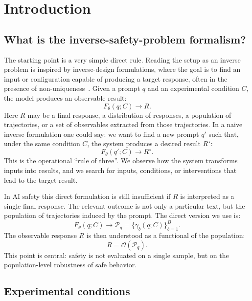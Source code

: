 \documentclass[10pt,twocolumn]{article}
\newcommand{\traj}{\gamma}
\newcommand{\rollouts}{\mathcal{P}}
\newcommand{\obs}{\mathcal{O}}
\begin{document}
\newpage

\section{Introduction}

\subsection{What is the inverse-safety-problem formalism?}

The starting point is a very simple direct rule. Reading the setup as an inverse problem is inspired by inverse-design formulations, where the goal is to find an input or configuration capable of producing a target response, often in the presence of non-uniqueness~\cite{liu2018training,molesky2018inverse}. Given a prompt \(q\) and an experimental condition \(C\), the model produces an observable result:
\[
F_{\theta}(q;C)\longrightarrow R.
\]
Here \(R\) may be a final response, a distribution of responses, a population of trajectories, or a set of observables extracted from those trajectories. In a naive inverse formulation one could say: we want to find a new prompt \(q'\) such that, under the same condition \(C\), the system produces a desired result \(R^\star\):
\[
F_{\theta}(q';C)\longrightarrow R^\star.
\]
This is the operational ``rule of three''. We observe how the system transforms inputs into results, and we search for inputs, conditions, or interventions that lead to the target result.

In AI safety this direct formulation is still insufficient if \(R\) is interpreted as a single final response. The relevant outcome is not only a particular text, but the population of trajectories induced by the prompt. The direct version we use is:
\[
F_{\theta}(q;C)
\longrightarrow
\rollouts_q
=
\{\traj_b(q;C)\}_{b=1}^{B}.
\]
The observable response \(R\) is then understood as a functional of the population:
\[
R=\obs(\rollouts_q).
\]
This point is central: safety is not evaluated on a single sample, but on the population-level robustness of safe behavior.

\subsection{Experimental conditions}
\end{document}
